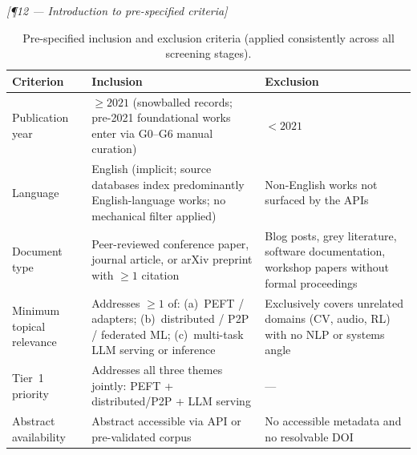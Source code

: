 \bigskip\noindent\textit{[¶12 — Introduction to pre-specified criteria]}

\begin{table}[htbp]
  \centering
  \caption{Pre-specified inclusion and exclusion criteria (applied
           consistently across all screening stages).}
  \label{tab:ie-criteria}
  \begin{tabular}{p{3.0cm}p{5.4cm}p{5.4cm}}
    \toprule
    \textbf{Criterion} & \textbf{Inclusion} & \textbf{Exclusion} \\
    \midrule
    Publication year
      & $\geq 2021$ (snowballed records; pre-2021 foundational works
        enter via G0--G6 manual curation)
      & $< 2021$ \\[4pt]
    Language
      & English (implicit; source databases index predominantly
        English-language works; no mechanical filter applied)
      & Non-English works not surfaced by the APIs \\[4pt]
    Document type
      & Peer-reviewed conference paper, journal article, or arXiv
        preprint with $\geq 1$ citation
      & Blog posts, grey literature, software documentation, workshop
        papers without formal proceedings \\[4pt]
    Minimum topical relevance
      & Addresses $\geq 1$ of: (a)~PEFT / adapters; (b)~distributed /
        P2P / federated ML; (c)~multi-task LLM serving or inference
      & Exclusively covers unrelated domains (CV, audio, RL) with no
        NLP or systems angle \\[4pt]
    Tier~1 priority
      & Addresses all three themes jointly: PEFT + distributed/P2P +
        LLM serving
      & --- \\[4pt]
    Abstract availability
      & Abstract accessible via API or pre-validated corpus
      & No accessible metadata and no resolvable DOI \\
    \bottomrule
  \end{tabular}
\end{table}


